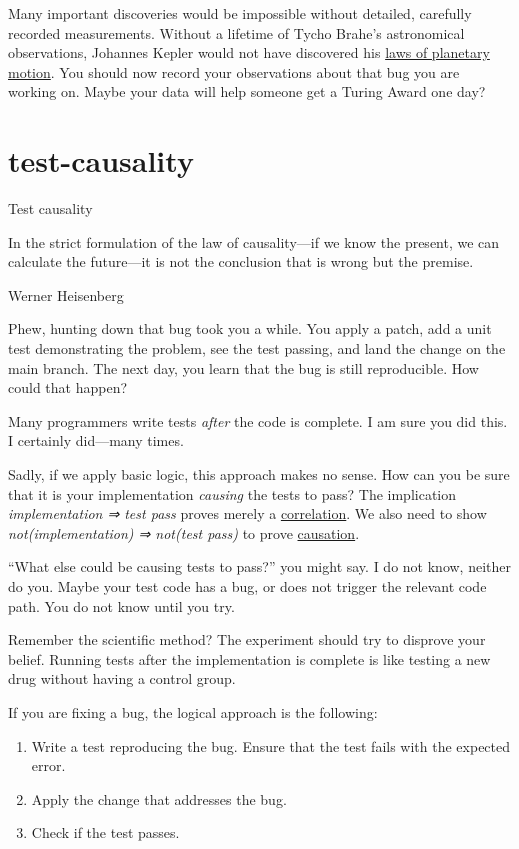 \documentclass{article}
\begin{document}
Many important discoveries would be impossible without detailed, carefully recorded measurements.
Without a lifetime of Tycho Brahe's astronomical observations, Johannes Kepler would not have discovered his \href{https://en.wikipedia.org/wiki/Kepler%27s_laws_of_planetary_motion}{laws of planetary motion}.
You should now record your observations about that bug you are working on.
Maybe your data will help someone get a Turing Award one day?

\section{test-causality}{Test causality}
\epigraph{
  In the strict formulation of the law of causality---if we know the present, we can calculate the future---it is not the conclusion that is wrong but the premise.
}{Werner Heisenberg}

Phew, hunting down that bug took you a while.
You apply a patch, add a unit test demonstrating the problem, see the test passing, and land the change on the main branch.
The next day, you learn that the bug is still reproducible.
How could that happen?

Many programmers write tests \emph{after} the code is complete.
I am sure you did this.
I certainly did—many times.

Sadly, if we apply basic logic, this approach makes no sense.
How can you be sure that it is your implementation \emph{causing} the tests to pass?
The implication \emph{implementation ⇒ test pass} proves merely a \href{https://en.wikipedia.org/wiki/Correlation}{correlation}.
We also need to show \emph{not(implementation) ⇒ not(test pass)} to prove \href{https://en.wikipedia.org/wiki/Causality}{causation}.

``What else could be causing tests to pass?'' you might say.
I do not know, neither do you.
Maybe your test code has a bug, or does not trigger the relevant code path.
You do not know until you try.

Remember the scientific method?
The experiment should try to disprove your belief.
Running tests after the implementation is complete is like testing a new drug without having a control group.

If you are fixing a bug, the logical approach is the following:
\begin{enumerate}
  \item Write a test reproducing the bug. Ensure that the test fails with the expected error.
  \item Apply the change that addresses the bug.
  \item Check if the test passes.
\end{enumerate}
\end{document}
